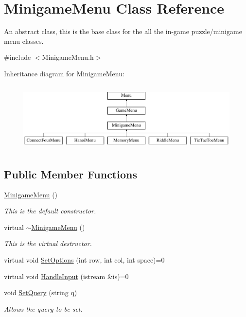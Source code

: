 \hypertarget{classMinigameMenu}{\section{Minigame\-Menu Class Reference}
\label{classMinigameMenu}
}


An abstract class, this is the base class for the all the in-\/game puzzle/minigame menu classes.  




{\ttfamily \#include $<$Minigame\-Menu.\-h$>$}

Inheritance diagram for Minigame\-Menu\-:\begin{figure}[H]
\begin{center}
\leavevmode
\includegraphics[height=3.555556cm]{classMinigameMenu}
\end{center}
\end{figure}
\subsection*{Public Member Functions}
\begin{DoxyCompactItemize}
\item 
\hyperlink{classMinigameMenu_a90d42578d68f68c3b26c414f90f2d950}{Minigame\-Menu} ()
\begin{DoxyCompactList}\small\item\em This is the default constructor. \end{DoxyCompactList}\item 
virtual \hyperlink{classMinigameMenu_a6b8621ca44319d6b2759766bdca9cbf9}{$\sim$\-Minigame\-Menu} ()
\begin{DoxyCompactList}\small\item\em This is the virtual destructor. \end{DoxyCompactList}\item 
virtual void \hyperlink{classMinigameMenu_abde3ae319bf1660a8626c6f765e054a8}{Set\-Options} (int row, int col, int space)=0
\item 
virtual void \hyperlink{classMinigameMenu_a3f854c4eefb0f3110cd085b3cfe56460}{Handle\-Input} (istream \&is)=0
\item 
void \hyperlink{classMinigameMenu_a875e8a60a910f28e245c998772d043e4}{Set\-Query} (string q)
\begin{DoxyCompactList}\small\item\em Allows the query to be set. \end{DoxyCompactList}\end{DoxyCompactItemize}
